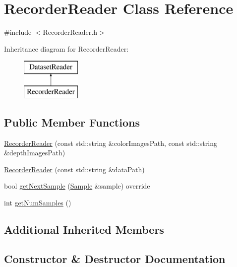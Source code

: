 \hypertarget{class_recorder_reader}{}\section{Recorder\+Reader Class Reference}
\label{class_recorder_reader}


{\ttfamily \#include $<$Recorder\+Reader.\+h$>$}

Inheritance diagram for Recorder\+Reader\+:\begin{figure}[H]
\begin{center}
\leavevmode
\includegraphics[height=2.000000cm]{class_recorder_reader}
\end{center}
\end{figure}
\subsection*{Public Member Functions}
\begin{DoxyCompactItemize}
\item 
\hyperlink{class_recorder_reader_acb4bf6e6d57e98f9d18735d9550568e5}{Recorder\+Reader} (const std\+::string \&color\+Images\+Path, const std\+::string \&depth\+Images\+Path)
\item 
\hyperlink{class_recorder_reader_a6870eb9da2db311ba366f60e602698b4}{Recorder\+Reader} (const std\+::string \&data\+Path)
\item 
bool \hyperlink{class_recorder_reader_afc52cde597201a1838e6e31b8c801941}{get\+Next\+Sample} (\hyperlink{struct_sample}{Sample} \&sample) override
\item 
int \hyperlink{class_recorder_reader_a5aba35af024680621c7af019049f0b6e}{get\+Num\+Samples} ()
\end{DoxyCompactItemize}
\subsection*{Additional Inherited Members}


\subsection{Constructor \& Destructor Documentation}
\mbox{\label{class_recorder_reader_acb4bf6e6d57e98f9d18735d9550568e5}} 
